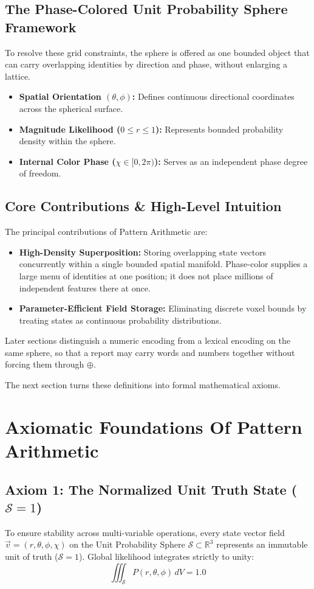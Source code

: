 \documentclass[12pt, a4paper]{article}
\begin{document}
\subsection{The Phase-Colored Unit Probability Sphere Framework}
To resolve these grid constraints, the sphere is offered as one bounded object that can carry overlapping identities by direction and phase, without enlarging a lattice.
\begin{itemize}
    \item \textbf{Spatial Orientation $(\theta, \phi)$:} Defines continuous directional coordinates across the spherical surface.
    \item \textbf{Magnitude Likelihood ($0 \leq r \leq 1$):} Represents bounded probability density within the sphere.
    \item \textbf{Internal Color Phase ($\chi \in [0, 2\pi)$):} Serves as an independent phase degree of freedom.
\end{itemize}

\subsection{Core Contributions \& High-Level Intuition}
The principal contributions of Pattern Arithmetic are:
\begin{itemize}
    \item \textbf{High-Density Superposition:} Storing overlapping state vectors concurrently within a single bounded spatial manifold. Phase-color supplies a large menu of identities at one position; it does not place millions of independent features there at once.
    \item \textbf{Parameter-Efficient Field Storage:} Eliminating discrete voxel bounds by treating states as continuous probability distributions.
\end{itemize}

Later sections distinguish a numeric encoding from a lexical encoding on the same sphere, so that a report may carry words and numbers together without forcing them through $\oplus$.

The next section turns these definitions into formal mathematical axioms.


\section{Axiomatic Foundations Of Pattern Arithmetic}

\subsection{Axiom 1: The Normalized Unit Truth State ($\mathcal{S} = 1$)}
\label{subsec:axiom1}
To ensure stability across multi-variable operations, every state vector field $\vec{v} = (r, \theta, \phi, \chi)$ on the Unit Probability Sphere $\mathcal{S} \subset \mathbb{R}^3$ represents an immutable unit of truth ($\mathcal{S} = 1$). Global likelihood integrates strictly to unity:
\begin{equation}
    \iiint_{\mathcal{S}} P(r, \theta, \phi) \, dV = 1.0
    \label{eq:unit_truth}
\end{equation}
\end{document}
